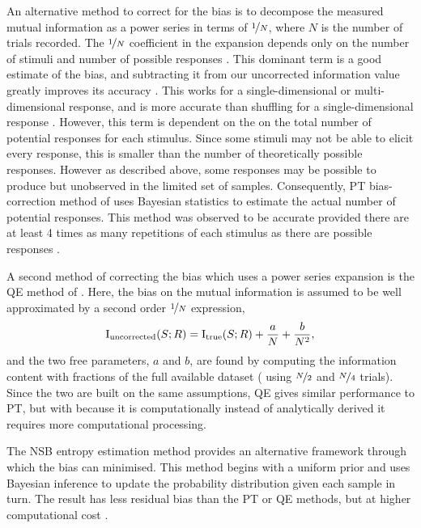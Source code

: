 An alternative method to correct for the bias is to decompose the measured mutual information as a power series in terms of $\nicefrac{1}{N}$, where $N$ is the number of trials recorded.
The $\nicefrac{1}{N}$ coefficient in the expansion depends only on the number of stimuli and number of possible responses \citep{Miller1955,Treves1995}.
This dominant term is a good estimate of the bias, and subtracting it from our uncorrected information value greatly improves its accuracy \citep{Treves1995}.
This works for a single-dimensional or multi-dimensional response, and is more accurate than shuffling for a single-dimensional response \citep{Panzeri1996}.
However, this term is dependent on the on the total number of potential responses for each stimulus.
Since some stimuli may not be able to elicit every response, this is smaller than the number of theoretically possible responses.
However as described above, some responses may be possible to produce but unobserved in the limited set of samples.
Consequently, \ac{PT} bias-correction method of \citet{Panzeri1996} uses Bayesian statistics to estimate the actual number of potential responses.
This method was observed to be accurate provided there are at least 4 times as many repetitions of each stimulus as there are possible responses \citep{Panzeri2007}.

A second method of correcting the bias which uses a power series expansion is the \ac{QE} method of \citet{Strong1998}.
Here, the bias on the mutual information is assumed to be well approximated by a second order $\nicefrac{1}{N}$ expression,
\begin{equation}
\operatorname{I}_{\text{uncorrected}}(S;R) =
\operatorname{I}_{\text{true}}(S;R) + \frac{a}{N} + \frac{b}{N^2}
,\end{equation}
and the two free parameters, $a$ and $b$, are found by computing the information content with fractions of the full available dataset (\ie{} using $\nicefrac{N}{2}$ and $\nicefrac{N}{4}$ trials).
Since the two are built on the same assumptions, \ac{QE} gives similar performance to \ac{PT}, but with because it is computationally instead of analytically derived it requires more computational processing.


The \ac{NSB} entropy estimation method \citep{Nemenman2004} provides an alternative framework through which the bias can minimised.
This method begins with a uniform prior and uses Bayesian inference to update the probability distribution given each sample in turn.
The result has less residual bias than the \ac{PT} or \ac{QE} methods, but at higher computational cost \citep{Panzeri2007}.

